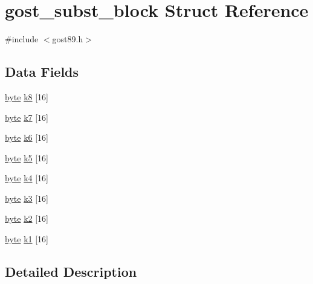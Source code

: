 \hypertarget{structgost__subst__block}{}\section{gost\+\_\+subst\+\_\+block Struct Reference}
\label{structgost__subst__block}


{\ttfamily \#include $<$gost89.\+h$>$}

\subsection*{Data Fields}
\begin{DoxyCompactItemize}
\item 
\hyperlink{gost89_8h_a0c8186d9b9b7880309c27230bbb5e69d}{byte} \hyperlink{structgost__subst__block_a2985f897970ba11bec36f04fd11596c4}{k8} \mbox{[}16\mbox{]}
\item 
\hyperlink{gost89_8h_a0c8186d9b9b7880309c27230bbb5e69d}{byte} \hyperlink{structgost__subst__block_a668b60b0b5c50972b049cbf64c2dcfe6}{k7} \mbox{[}16\mbox{]}
\item 
\hyperlink{gost89_8h_a0c8186d9b9b7880309c27230bbb5e69d}{byte} \hyperlink{structgost__subst__block_a92b0d370647438b8f833b447097130bb}{k6} \mbox{[}16\mbox{]}
\item 
\hyperlink{gost89_8h_a0c8186d9b9b7880309c27230bbb5e69d}{byte} \hyperlink{structgost__subst__block_a6b91b882555222d6234042987193c336}{k5} \mbox{[}16\mbox{]}
\item 
\hyperlink{gost89_8h_a0c8186d9b9b7880309c27230bbb5e69d}{byte} \hyperlink{structgost__subst__block_a17ca61200a998105efcb2f0b6fd468ac}{k4} \mbox{[}16\mbox{]}
\item 
\hyperlink{gost89_8h_a0c8186d9b9b7880309c27230bbb5e69d}{byte} \hyperlink{structgost__subst__block_a52059b620bae96e24900fb0257130604}{k3} \mbox{[}16\mbox{]}
\item 
\hyperlink{gost89_8h_a0c8186d9b9b7880309c27230bbb5e69d}{byte} \hyperlink{structgost__subst__block_a2fac7da5cfefcadf8882002dc4c6f631}{k2} \mbox{[}16\mbox{]}
\item 
\hyperlink{gost89_8h_a0c8186d9b9b7880309c27230bbb5e69d}{byte} \hyperlink{structgost__subst__block_a6b68592eed24975c71c18fe7402b82e1}{k1} \mbox{[}16\mbox{]}
\end{DoxyCompactItemize}


\subsection{Detailed Description}


